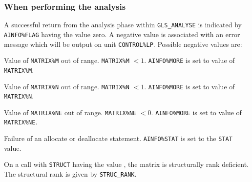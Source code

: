 \documentclass{galahad}
\newcommand{\packagename}{GLS}
\begin{document}

\galerrors
\subsubsection{When performing the analysis} \label{errora}

A successful return from the analysis phase within {\tt \packagename\_ANALYSE}
  is indicated by {\tt AINFO\%FLAG}  having the value zero.  A negative value is
 associated with an error message which will  be output on unit
 {\tt CONTROL\%LP}. Possible negative values are:

\begin{description}

  Value of {\tt MATRIX\%M} out of range.  {\tt MATRIX\%M} $<1$.
{\tt AINFO\%MORE} is set to value of {\tt MATRIX\%M}.

  Value of {\tt MATRIX\%N} out of range.  {\tt MATRIX\%N} $<1$.
{\tt AINFO\%MORE} is set to value of {\tt MATRIX\%N}.

  Value of {\tt MATRIX\%NE} out of range.  {\tt MATRIX\%NE} $<0$.
{\tt AINFO\%MORE} is set to value of {\tt MATRIX\%NE}.

  Failure of an allocate or deallocate statement. {\tt AINFO\%STAT}
is set to the {\tt STAT} value.

  On a call with {\tt STRUCT} having the value \true,
        the matrix is structurally rank deficient.
       The structural rank is given by {\tt STRUC\_RANK}.

\end{description}
\end{document}
